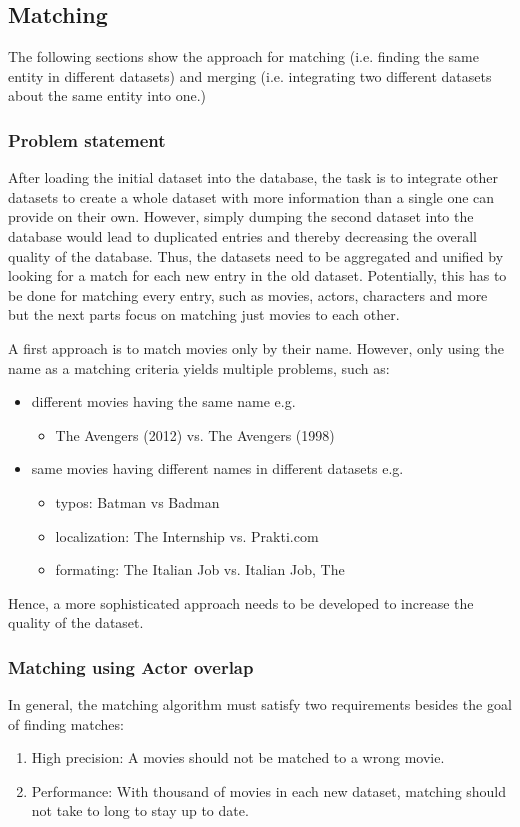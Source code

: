 \subsection{Matching}
\label{subsec_method_matching}

The following sections show the approach for matching (i.e. finding the same entity in different datasets) and merging (i.e. integrating two different datasets about the same entity into one.)

\subsubsection{Problem statement}
After loading the initial dataset into the database, the task is to integrate other datasets to create a whole dataset with more information than a single one can provide on their own.
However, simply dumping the second dataset into the database would lead to duplicated entries and thereby decreasing the overall quality of the database.
Thus, the datasets need to be aggregated and unified by looking for a match for each new entry in the old dataset.
Potentially, this has to be done for matching every entry, such as movies, actors, characters and more but the next parts focus on matching just movies to each other.

A first approach is to match movies only by their name.
However, only using the name as a matching criteria yields multiple problems, such as:
\begin{itemize}
	\item different movies having the same name e.g.
	\begin{itemize} 
        \item The Avengers (2012) vs. The Avengers (1998)
    \end{itemize}
	\item same movies having different names in different datasets e.g.
	\begin{itemize} 
        \item typos: Batman vs Badman
        \item localization: The Internship vs. Prakti.com
        \item formating: The Italian Job vs. Italian Job, The
     \end{itemize}
\end{itemize}
Hence, a more sophisticated approach needs to be developed to increase the quality of the dataset.

\subsubsection{Matching using Actor overlap}
In general, the matching algorithm must satisfy two requirements besides the goal of finding matches:
\begin{enumerate}
	\item{High precision:} A movies should not be matched to a wrong movie.
	\item{Performance:} With thousand of movies in each new dataset, matching should not take to long to stay up to date. %
\end{enumerate}

